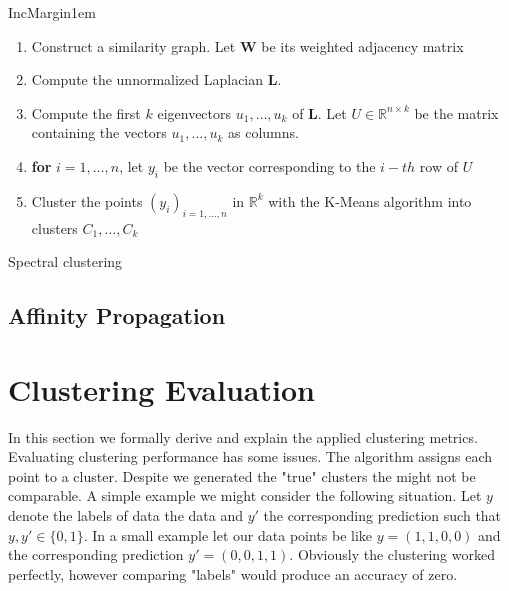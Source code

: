\documentclass[12pt,a4paper,bibliography=totocnumbered,listof=totocnumbered]{scrartcl}
\begin{document}
{\begin{appendix}
IncMargin{1em}
\begin{algorithm}
	\BlankLine
	\begin{enumerate}
		\item Construct a similarity graph. Let \textbf{W} be its weighted adjacency matrix
		\item Compute the unnormalized Laplacian \textbf{L}.
		\item Compute the first $k$ eigenvectors $u_1,\dots,u_k$ of \textbf{L}. Let $U \in \mathbb{R}^{n \times k}$ be the matrix containing the vectors $u_1,\dots,u_k$ as columns.
		\item \textbf{for} $i = 1,\dots,n$, let $y_i$ be the vector corresponding to the $i-th$ row of $U$
		\item Cluster the points $(y_i)_{i=1,\dots,n}$ in $\mathbb{R}^k$ with the K-Means algorithm into clusters $C_1,\dots,C_k$
	\end{enumerate}
	\caption{Spectral clustering}
	\label{alg:agglc}
\end{algorithm}\DecMargin{1em}

\subsection{Affinity Propagation}

\cite{Brusco2008}

\pagebreak

\section{Clustering Evaluation}
\label{sec:ce}
In this section we formally derive and explain the applied clustering metrics. Evaluating clustering performance has some issues. The algorithm assigns each point to a cluster. Despite we generated the "true" clusters the might not be comparable. A simple example we might consider the following situation. Let $y$ denote the labels of data the data and $y'$ the corresponding prediction such that  $y,y' \in \{0,1\}$. In a small example let our data points be like $y=(1,1,0,0)$ and the corresponding prediction $y'=(0,0,1,1)$. Obviously the clustering worked perfectly, however comparing "labels" would produce an accuracy of zero. 


\end{appendix}}
\end{document}
